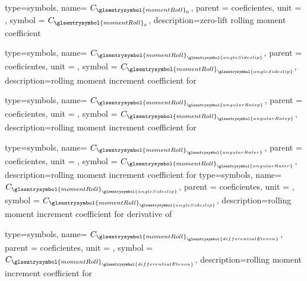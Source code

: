 {type=symbols,
    name= \ensuremath{C_{\glsentrysymbol{momentRoll}_{0}}},
    parent = {coeficientes},
    unit = \unexpanded{},
    symbol = \ensuremath{C_{\glsentrysymbol{momentRoll}_{0}}},
    description={zero-lift rolling moment coefficient}
}

{type=symbols,
    name= \ensuremath{C_{{\glsentrysymbol{momentRoll}}_{\glsentrysymbol{angleSideslip}}}},
    parent = {coeficientes},
    unit = \unexpanded{},
    symbol = \ensuremath{C_{{\glsentrysymbol{momentRoll}}_{\glsentrysymbol{angleSideslip}}}},
    description={rolling moment increment coefficient for }
}

{type=symbols,
    name= \ensuremath{C_{{\glsentrysymbol{momentRoll}}_{\glsentrysymbol{angularRatep}}}},
    parent = {coeficientes},
    unit = \unexpanded{},
    symbol = \ensuremath{C_{{\glsentrysymbol{momentRoll}}_{\glsentrysymbol{angularRatep}}}},
    description={rolling moment increment coefficient for }
}

{type=symbols,
    name= \ensuremath{C_{{\glsentrysymbol{momentRoll}}_{\glsentrysymbol{angularRater}}}},
    parent = {coeficientes},
    unit = \unexpanded{},
    symbol = \ensuremath{C_{{\glsentrysymbol{momentRoll}}_{\glsentrysymbol{angularRater}}}},
    description={rolling moment increment coefficient for }
}
{type=symbols,
    name= \ensuremath{C_{{\glsentrysymbol{momentRoll}}_{\dot{\glsentrysymbol{angleSideslip}}}}},
    parent = {coeficientes},
    unit = \unexpanded{},
    symbol = \ensuremath{C_{{\glsentrysymbol{momentRoll}}_{\dot{\glsentrysymbol{angleSideslip}}}}},
    description={rolling moment increment coefficient for derivative of }
}


{type=symbols,
    name= \ensuremath{C_{{\glsentrysymbol{momentRoll}}_{\glsentrysymbol{differentialElevon}}}},
    parent = {coeficientes},
    unit = \unexpanded{},
    symbol = \ensuremath{C_{{\glsentrysymbol{momentRoll}}_{\glsentrysymbol{differentialElevon}}}},
    description={rolling moment increment coefficient for }
}


